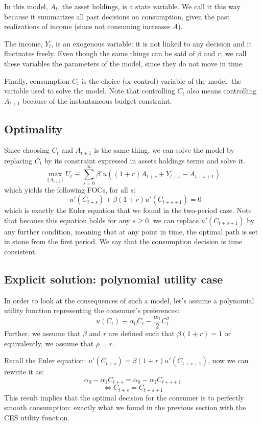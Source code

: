 \documentclass[12pt]{report}
\begin{document}
In this model, $A_t$, the asset holdings, is a state variable. We call it this way because it summarizes all past decisions on consumption, given the past realizations of income (since not consuming increases $A$).

The income, $Y_t$, is an exogenous variable: it is not linked to any decision and it fluctuates freely. Even though the same things can be said of $\beta$ and $r$, we call these variables the parameters of the model, since they do not move in time.

Finally, consumption $C_t$ is the choice (or control) variable of the model: the variable used to solve the model. Note that controlling $C_t$ also means controlling $A_{t+1}$ because of the instantaneous budget constraint.

\subsection{Optimality}

Since choosing $C_t$ and $A_{t+1}$ is the same thing, we can solve the model by replacing $C_t$ by its constraint expressed in assets holdings terms and solve it. $$\max_{\{A_{t+1}\}} U_t \equiv \sum_{s=0}^{\infty} \beta^{s} u((1+r)A_{t+s} + Y_{t+s} - A_{t+s+1}) $$ which yields the following FOCs, for all $s$: $$ - u'(C_{t+s}) +\beta(1+r)u'(C_{t+s+1}) = 0 $$ which is exactly the Euler equation that we found in the two-period case. Note that because this equation holds for any $s\geq 0$, we can replace $u'(C_{t+s+1})$ by any further condition, meaning that at any point in time, the optimal path is set in stone from the first period. We say that the consumption decision is time consistent.

\subsection{Explicit solution: polynomial utility case}

In order to look at the consequences of such a model, let's assume a polynomial utility function representing the consumer's preferences: $$u(C_t) \equiv \alpha_0 C_t - \frac{\alpha_1}{2} C_t^2 $$ Further, we assume that $\beta$ and $r$ are defined such that $\beta(1+r)=1$ or equivalently, we assume that $\rho = r$.

Recall the Euler equation: $u'(C_{t+s}) = \beta(1+r)u'(C_{t+s+1})$, now we can rewrite it as: $$\alpha_0 - \alpha_1C_{t+s} = \alpha_0 - \alpha_1C_{t+s+1} $$ $$\Leftrightarrow C_{t+s} = C_{t+s+1} $$ This result implies that the optimal decision for the consumer is to perfectly smooth consumption: exactly what we found in the previous section with the CES utility function.
\end{document}
